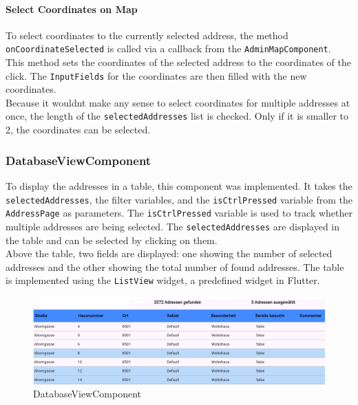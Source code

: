 \paragraph{Select Coordinates on Map}
\label{fig:Select Coordinates on Map}

To select coordinates to the currently selected address, the method \texttt{onCoordinateSelected} is called via a callback from the \texttt{AdminMapComponent}. This method sets the coordinates of the selected address to the coordinates of the click. The \texttt{InputFields} for the coordinates are then filled with the new coordinates.\\ 

Because it wouldnt make any sense to select coordinates for multiple addresses at once, the length of the \texttt{selectedAddresses} list is checked. Only if it is smaller to 2, the coordinates can be selected.


\subsubsection{DatabaseViewComponent}
\label{fig:DatabaseViewComponent}
To display the addresses in a table, this component was implemented. It takes the \texttt{selectedAddresses}, the filter variables, and the \texttt{isCtrlPressed} variable from the \texttt{AddressPage} as parameters. The \texttt{isCtrlPressed} variable is used to track whether multiple addresses are being selected. The \texttt{selectedAddresses} are displayed in the table and can be selected by clicking on them.\\

Above the table, two fields are displayed: one showing the number of selected addresses and the other showing the total number of found addresses. The table is implemented using the \texttt{ListView} widget, a predefined widget in Flutter.


\begin{figure}[H]
    \centering
    \includegraphics[width=0.9\linewidth]{images/AdminPanel/DataBaseViewComponent.png}
    \caption{DatabaseViewComponent}
\end{figure}



